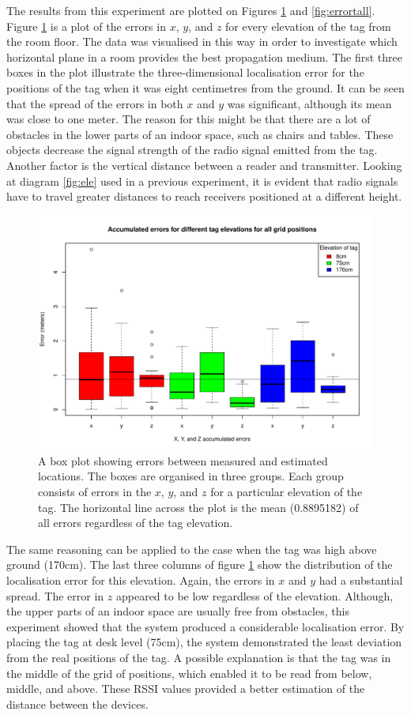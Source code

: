 The results from this experiment are plotted on Figures \ref{fig:errorbox3d} and \ref{fig:errortall}. Figure \ref{fig:errorbox3d} is a plot of the errors in $x$, $y$, and $z$ for every elevation of the tag from the room floor. The data was visualised in this way in order to investigate which horizontal plane in a room provides the best propagation medium. The first three boxes in the plot illustrate the three-dimensional localisation error for the positions of the tag when it was eight centimetres from the ground. It can be seen that the spread of the errors in both $x$ and $y$ was significant, although its mean was close to one meter. The reason for this might be that there are a lot of obstacles in the lower parts of an indoor space, such as chairs and tables. These objects decrease the signal strength of the radio signal emitted from the tag. Another factor is the vertical distance between a reader and transmitter. Looking at diagram \ref{fig:ele} used in a previous experiment, it is evident that radio signals have to travel greater distances to reach receivers positioned at a different height.
\begin{figure}[H]
	\begin{center}
		\includegraphics[width=.8\textwidth]{figures/error_boxplot_3d}
		\caption{A box plot showing errors between measured and estimated locations. The boxes are organised in three groups. Each group consists of errors in the $x$, $y$, and $z$ for a particular elevation of the tag. The horizontal line across the plot is the mean (0.8895182) of all errors regardless of the tag elevation.}
		\label{fig:errorbox3d}
	\end{center}
\end{figure}
The same reasoning can be applied to the case when the tag was high above ground (170cm). The last three columns of figure \ref{fig:errorbox3d} show the distribution of the localisation error for this elevation. Again, the errors in $x$ and $y$ had a substantial spread. The error in $z$ appeared to be low regardless of the elevation. Although, the upper parts of an indoor space are usually free from obstacles, this experiment showed that the system produced a considerable localisation error. By placing the tag at desk level (75cm), the system demonstrated the least deviation from the real positions of the tag. A possible explanation is that the tag was in the middle of the grid of positions, which enabled it to be read from below, middle, and above. These RSSI values provided a better estimation of the distance between the devices.

